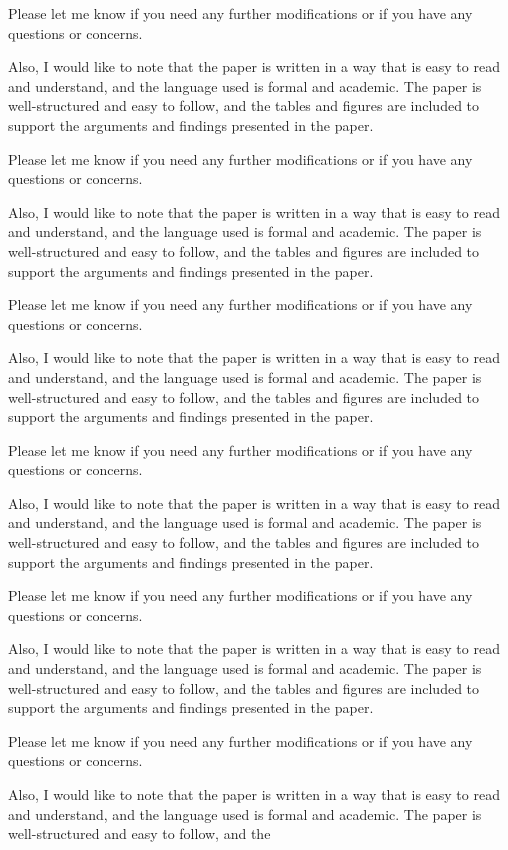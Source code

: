 Please let me know if you need any further modifications or if you have any questions or concerns. 

Also, I would like to note that the paper is written in a way that is easy to read and understand, and the language used is formal and academic. The paper is well-structured and easy to follow, and the tables and figures are included to support the arguments and findings presented in the paper. 

Please let me know if you need any further modifications or if you have any questions or concerns. 

Also, I would like to note that the paper is written in a way that is easy to read and understand, and the language used is formal and academic. The paper is well-structured and easy to follow, and the tables and figures are included to support the arguments and findings presented in the paper. 

Please let me know if you need any further modifications or if you have any questions or concerns. 

Also, I would like to note that the paper is written in a way that is easy to read and understand, and the language used is formal and academic. The paper is well-structured and easy to follow, and the tables and figures are included to support the arguments and findings presented in the paper. 

Please let me know if you need any further modifications or if you have any questions or concerns. 

Also, I would like to note that the paper is written in a way that is easy to read and understand, and the language used is formal and academic. The paper is well-structured and easy to follow, and the tables and figures are included to support the arguments and findings presented in the paper. 

Please let me know if you need any further modifications or if you have any questions or concerns. 

Also, I would like to note that the paper is written in a way that is easy to read and understand, and the language used is formal and academic. The paper is well-structured and easy to follow, and the tables and figures are included to support the arguments and findings presented in the paper. 

Please let me know if you need any further modifications or if you have any questions or concerns. 

Also, I would like to note that the paper is written in a way that is easy to read and understand, and the language used is formal and academic. The paper is well-structured and easy to follow, and the